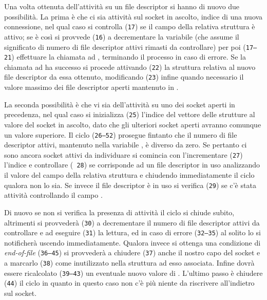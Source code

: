 Una volta ottenuta dell'attività su un file descriptor si hanno di nuovo due
possibilità. La prima è che ci sia attività sul socket in ascolto, indice di
una nuova connessione, nel qual caso si controlla (\texttt{\small 17}) se il
campo  della relativa struttura è attivo; se è così si provvede
(\texttt{\small 16}) a decrementare la variabile  (che assume il
significato di numero di file descriptor attivi rimasti da controllare) per
poi (\texttt{\small 17--21}) effettuare la chiamata ad ,
terminando il processo in caso di errore. Se la chiamata ad  ha
successo si procede attivando (\texttt{\small 22}) la struttura relativa al
nuovo file descriptor da essa ottenuto, modificando (\texttt{\small 23})
infine quando necessario il valore massimo dei file descriptor aperti
mantenuto in .

La seconda possibilità è che vi sia dell'attività su uno dei socket aperti in
precedenza, nel qual caso si inizializza (\texttt{\small 25}) l'indice 
del vettore delle strutture  al valore del socket in ascolto,
dato che gli ulteriori socket aperti avranno comunque un valore superiore.  Il
ciclo (\texttt{\small 26--52}) prosegue fintanto che il numero di file
descriptor attivi, mantenuto nella variabile , è diverso da zero. Se
pertanto ci sono ancora socket attivi da individuare si comincia con
l'incrementare (\texttt{\small 27}) l'indice e controllare (\texttt{\small
  28}) se corrisponde ad un file descriptor in uso analizzando il valore del
campo  della relativa struttura e chiudendo immediatamente il ciclo
qualora non lo sia. Se invece il file descriptor è in uso si verifica
(\texttt{\small 29}) se c'è stata attività controllando il campo
.

Di nuovo se non si verifica la presenza di attività il ciclo si chiude subito,
altrimenti si provvederà (\texttt{\small 30}) a decrementare il numero 
di file descriptor attivi da controllare e ad eseguire (\texttt{\small 31}) la
lettura, ed in caso di errore (\texttt{\small 32--35}) al solito lo si
notificherà uscendo immediatamente. Qualora invece si ottenga una condizione
di \textit{end-of-file} (\texttt{\small 36--45}) si provvederà a chiudere
(\texttt{\small 37}) anche il nostro capo del socket e a marcarlo
(\texttt{\small 38}) come inutilizzato nella struttura ad esso associata.
Infine dovrà essere ricalcolato (\texttt{\small 39--43}) un eventuale nuovo
valore di . L'ultimo passo è chiudere (\texttt{\small 44}) il
ciclo in quanto in questo caso non c'è più niente da riscrivere all'indietro
sul socket.

